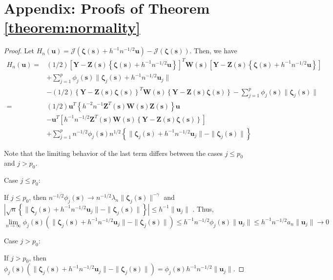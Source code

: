 \documentclass[english]{article}\usepackage[]{graphicx}\usepackage[]{color}
\theoremstyle{plain}
\theoremstyle{plain}
\begin{document}
\section*{Appendix: Proofs of Theorem \ref{theorem:normality}\label{sec:gaussian-normality-proof} }
\begin{proof}
Let $H_{n}(\bm{u})=\mathcal{J}\left(\bm{\zeta}\left(\bm{s}\right)+h^{-1}n^{-1/2}\bm{u}\right)-\mathcal{J}\left(\bm{\zeta}\left(\bm{s}\right)\right)$.
Then, we have 
\begin{align}
H_{n}\left(\bm{u}\right)= & (1/2)\left[\bm{Y}-\bm{Z}(\bm{s})\left\{ \bm{\zeta}\left(\bm{s}\right)+h^{-1}n^{-1/2}\bm{u}\right\} \right]^{T}\bm{W}(\bm{s})\left[\bm{Y}-\bm{Z}(\bm{s})\left\{ \bm{\zeta}\left(\bm{s}\right)+h^{-1}n^{-1/2}\bm{u}\right\} \right]\\
 & +\sum_{j=1}^{p}\phi_{j}(\bm{s})\|\bm{\zeta}_{j}(\bm{s})+h^{-1}n^{-1/2}\bm{u}_{j}\|\\
 & -(1/2)\left\{ \bm{Y}-\bm{Z}(\bm{s})\bm{\zeta}(\bm{s})\right\} ^{T}\bm{W}(\bm{s})\left\{ \bm{Y}-\bm{Z}(\bm{s})\bm{\zeta}(\bm{s})\right\} -\sum_{j=1}^{p}\phi_{j}(\bm{s})\|\bm{\zeta}_{j}(\bm{s})\|\\
= & (1/2)\bm{u}^{T}\left\{ h^{-2}n^{-1}\bm{Z}^{T}(\bm{s})\bm{W}(\bm{s})\bm{Z}(\bm{s})\right\} \bm{u}\\
 & -\bm{u}^{T}\left[h^{-1}n^{-1/2}\bm{Z}^{T}(\bm{s})\bm{W}(\bm{s})\left\{ \bm{Y}-\bm{Z}(\bm{s})\bm{\zeta}(\bm{s})\right\} \right]\\
 & +\sum_{j=1}^{p}n^{-1/2}\phi_{j}(\bm{s})n^{1/2}\left\{ \|\bm{\zeta}_{j}(\bm{s})+h^{-1}n^{-1/2}\bm{u}_{j}\|-\|\bm{\zeta}_{j}(\bm{s})\|\right\} 
\end{align}


Note that the limiting behavior of the last term differs between the
cases $j\le p_{0}$ and $j>p_{0}$.

Case $j\le p_{0}$:

If $j\le p_{0}$, then $n^{-1/2}\phi_{j}(\bm{s})\to n^{-1/2}\lambda_{n}\|\bm{\zeta}_{j}(\bm{s})\|^{-\gamma}$
and $|\sqrt{n}\left\{ \|\bm{\zeta}_{j}(\bm{s})+h^{-1}n^{-1/2}\bm{u}_{j}\|-\|\bm{\zeta}_{j}(\bm{s})\|\right\} |\le h^{-1}\|\bm{u}_{j}\|$
. Thus, 
\[
\lim\limits _{n\to\infty}\phi_{j}(\bm{s})\left(\|\bm{\zeta}_{j}(\bm{s})+h^{-1}n^{-1/2}\bm{u}_{j}\|-\|\bm{\zeta}_{j}(\bm{s})\|\right)\le h^{-1}n^{-1/2}\phi_{j}(\bm{s})\|\bm{u}_{j}\|\le h^{-1}n^{-1/2}a_{n}\|\bm{u}_{j}\|\to0
\]


Case $j>p_{0}$:

If $j>p_{0}$, then $\phi_{j}(\bm{s})\left(\|\bm{\zeta}_{j}(\bm{s})+h^{-1}n^{-1/2}\bm{u}_{j}\|-\|\bm{\zeta}_{j}(\bm{s})\|\right)=\phi_{j}(\bm{s})h^{-1}n^{-1/2}\|\bm{u}_{j}\|$.


\end{proof}
\end{document}
